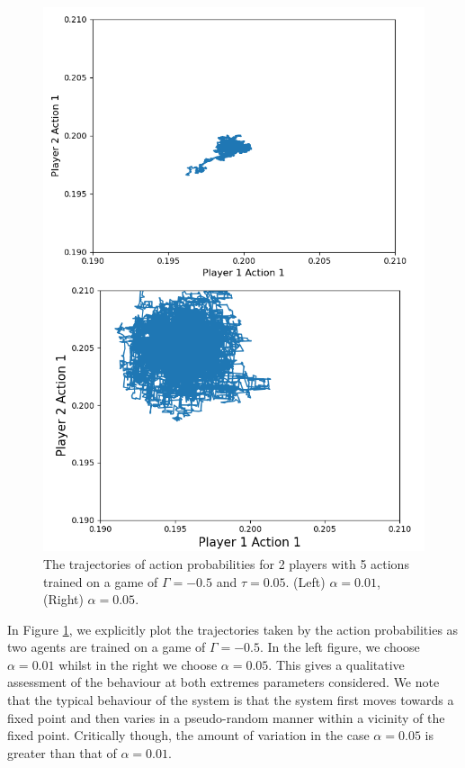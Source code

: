 \documentclass[sigconf,anonymous]{aamas}
\begin{document}
\begin{figure}[t]
    \includegraphics[width = 0.75 \linewidth, center]{Figures/alphavar5e2.png}
    \caption{The trajectories of action probabilities for 2 players with 5 actions trained on a game of $\Gamma = -0.5$ and $\tau = 0.05$. (Left) $\alpha = 0.01$, (Right) $\alpha = 0.05$.}
    \label{fig:AlphaVariation}
\end{figure}

In Figure \ref{fig:AlphaVariation}, we explicitly plot the trajectories taken by the action probabilities as two agents are trained on a game of $\Gamma = -0.5$. In the left figure, we choose $\alpha = 0.01$ whilst in the right we choose $\alpha = 0.05$. This gives a qualitative assessment of the behaviour at both extremes parameters considered. We note that the typical behaviour of the system is that the system first moves towards a fixed point and then varies in a pseudo-random manner within a vicinity of the fixed point. Critically though, the amount of variation in the case $\alpha = 0.05$ is greater than that of $\alpha = 0.01$. 
\end{document}
